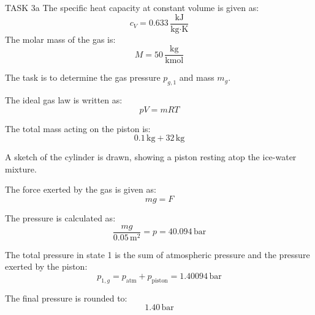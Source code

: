 TASK 3a  
The specific heat capacity at constant volume is given as:  
\[
c_V = 0.633 \, \frac{\text{kJ}}{\text{kg·K}}
\]  
The molar mass of the gas is:  
\[
M = 50 \, \frac{\text{kg}}{\text{kmol}}
\]  

The task is to determine the gas pressure \( p_{g,1} \) and mass \( m_g \).  

The ideal gas law is written as:  
\[
pV = mRT
\]  

The total mass acting on the piston is:  
\[
0.1 \, \text{kg} + 32 \, \text{kg}
\]  

A sketch of the cylinder is drawn, showing a piston resting atop the ice-water mixture.  

The force exerted by the gas is given as:  
\[
mg = F
\]  

The pressure is calculated as:  
\[
\frac{mg}{0.05 \, \text{m}^2} = p = 40.094 \, \text{bar}
\]  

The total pressure in state 1 is the sum of atmospheric pressure and the pressure exerted by the piston:  
\[
p_{1,g} = p_{\text{atm}} + p_{\text{piston}} = 1.40094 \, \text{bar}
\]  

The final pressure is rounded to:  
\[
1.40 \, \text{bar}
\]